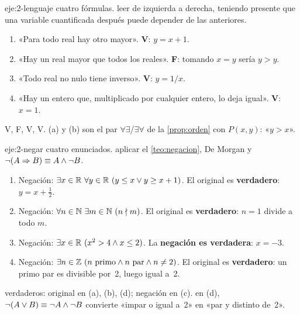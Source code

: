 \begin{solucion}{eje:2-lenguaje}
\datos cuatro fórmulas.
\planteamiento leer de izquierda a derecha, teniendo presente que una variable cuantificada después puede depender de las anteriores.
\pasos
\begin{enumerate}[label=(\alph*)]
  \item «Para todo real hay otro mayor». \textbf{V}: $y=x+1$.
  \item «Hay un real mayor que todos los reales». \textbf{F}: tomando $x=y$ sería $y>y$.
  \item «Todo real no nulo tiene inverso». \textbf{V}: $y=1/x$.
  \item «Hay un entero que, multiplicado por cualquier entero, lo deja igual». \textbf{V}: $x=1$.
\end{enumerate}
\resultado V, F, V, V.
\comprobacion (a) y (b) son el par $\forall\exists$/$\exists\forall$ de la \cref{prop:orden} con $P(x,y)$: «$y>x$».
\end{solucion}

\begin{solucion}{eje:2-negar}
\datos cuatro enunciados.
\planteamiento aplicar el \cref{teo:negacion}, De Morgan y $\neg(A\Rightarrow B)\equiv A\wedge\neg B$.
\pasos
\begin{enumerate}[label=(\alph*)]
  \item Negación: $\exists x\in\mathbb{R}\ \forall y\in\mathbb{R}\ (y\le x\vee y\ge x+1)$. El original es \textbf{verdadero}: $y=x+\tfrac12$.
  \item Negación: $\forall n\in\mathbb{N}\ \exists m\in\mathbb{N}\ (n\nmid m)$. El original es \textbf{verdadero}: $n=1$ divide a todo $m$.
  \item Negación: $\exists x\in\R\ (x^{2}>4\wedge x\le 2)$. La \textbf{negación es verdadera}: $x=-3$.
  \item Negación: $\exists n\in\mathbb{Z}\ (n\text{ primo}\wedge n\text{ par}\wedge n\neq 2)$. El original es \textbf{verdadero}: un primo par es divisible por~2, luego igual a~2.
\end{enumerate}
\resultado verdaderos: original en (a), (b), (d); negación en (c).
\comprobacion en (d), $\neg(A\vee B)\equiv\neg A\wedge\neg B$ convierte «impar o igual a~2» en «par y distinto de~2».
\end{solucion}

